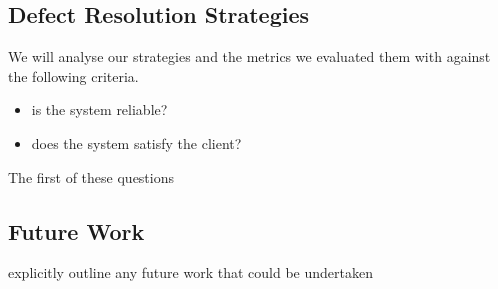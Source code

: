 \subsection{Defect Resolution Strategies}

We will analyse our strategies and the metrics we evaluated them with against the following criteria.
\begin{itemize}
	\item is the system reliable?
	\item does the system satisfy the client?
\end{itemize}

The first of these questions

\subsection{Future Work}

\FIXME explicitly outline any future work that could be undertaken
